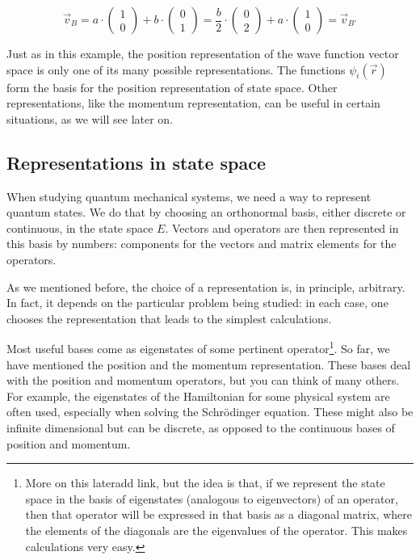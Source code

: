 \begin{equation}
    \vec{v}_B = a\cdot \begin{pmatrix}
        1 \\ 0
    \end{pmatrix} + b \cdot \begin{pmatrix}
        0 \\ 1
    \end{pmatrix} = 
    \frac{b}{2}\cdot \begin{pmatrix}
        0 \\ 2
    \end{pmatrix} + a \cdot \begin{pmatrix}
        1 \\ 0
    \end{pmatrix} = \vec{v}_{B'}
\end{equation}

Just as in this example, the position representation of the wave function vector space is only one of its many possible representations. The functions $\psi_i\left(\vec{r}\right)$ form the basis for the position representation of state space. Other representations, like the momentum representation, can be useful in certain situations, as we will see later on. 


\subsection{Representations in state space}

When studying quantum mechanical systems, we need a way to represent quantum states. We do that by choosing an orthonormal basis, either discrete or continuous, in the state space {\color{red}$E$}. Vectors and operators are then represented in this basis by numbers: components for the vectors and matrix elements for the operators.

As we mentioned before, the choice of a representation is, in principle, arbitrary. In fact, it depends on the particular problem being studied: in each case, one chooses the representation that leads to the simplest calculations. 

Most useful bases come as eigenstates of some pertinent operator\footnote{More on this later{\color{red}add link}, but the idea is that, if we represent the state space in the basis of eigenstates (analogous to eigenvectors) of an operator, then that operator will be expressed in that basis as a diagonal matrix, where the elements of the diagonals are the eigenvalues of the operator. This makes calculations very easy.}. So far, we have mentioned the position and the momentum representation. These bases deal with the position and momentum operators, but you can think of many others. For example, the eigenstates of the Hamiltonian for some physical system are often used, especially when solving the Schrödinger equation. These might also be infinite dimensional but can be discrete, as opposed to the continuous bases of position and momentum.

